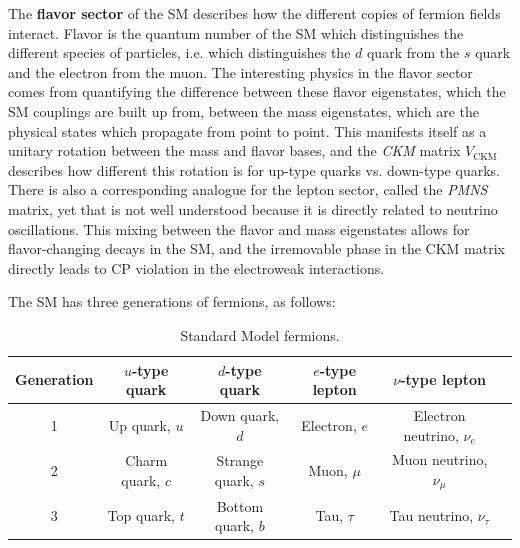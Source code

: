 \documentclass[11pt, oneside]{article}   	%
\theoremstyle{definition}
\numberwithin{equation}{subsection}		%
\begin{document}
The \textbf{flavor sector} of the SM describes how the different copies of fermion fields interact. Flavor is the quantum number 
of the SM which distinguishes the different species of particles, i.e. which distinguishes the $d$ quark from the $s$ quark and the 
electron from the muon. The interesting physics in the flavor sector comes from quantifying the difference between these 
flavor eigenstates, which the SM couplings are built up from, between the mass eigenstates, which are the physical states which 
propagate from point to point. This manifests itself as a unitary rotation between the mass and flavor bases, and the 
\textit{CKM} matrix $V_\mathrm{CKM}$ describes how different this rotation is for up-type quarks vs. down-type quarks. There 
is also a corresponding analogue for the lepton sector, called the \textit{PMNS} matrix, yet that is not well understood because 
it is directly related to neutrino oscillations. This mixing between the flavor and mass eigenstates allows for flavor-changing decays 
in the SM, and the irremovable phase in the CKM matrix directly leads to CP violation in the electroweak interactions. 

The SM has three generations of fermions, as follows:
\begin{table}[H]
	\centering
	\begin{tabular}{ | c | c | c | c | c | c | }
		\hline
		Generation & $u$-type quark & $d$-type quark & $e$-type lepton &$\nu$-type lepton \\
		\hline
		1 & Up quark, $u$ & Down quark, $d$ & Electron, $e$ & Electron neutrino, $\nu_e$ \\
		\hline
		2 & Charm quark, $c$ & Strange quark, $s$ & Muon, $\mu$ & Muon neutrino, $\nu_\mu$ \\
		\hline
		3 & Top quark, $t$ & Bottom quark, $b$ & Tau, $\tau$ & Tau neutrino, $\nu_\tau$ \\
		\hline
	\end{tabular}
	\caption{Standard Model fermions.}
	\label{table:sm_fermions}
\end{table}
\end{document}
